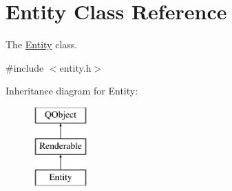 \hypertarget{class_entity}{}\section{Entity Class Reference}
\label{class_entity}


The \hyperlink{class_entity}{Entity} class.  




{\ttfamily \#include $<$entity.\+h$>$}

Inheritance diagram for Entity\+:\begin{figure}[H]
\begin{center}
\leavevmode
\includegraphics[height=3.000000cm]{class_entity}
\end{center}
\end{figure}
